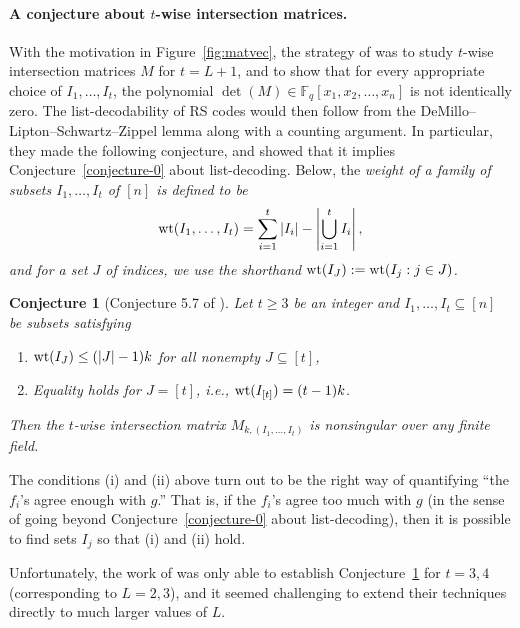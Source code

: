 \documentclass[11pt]{article}
\newtheorem{conjecture}[theorem]{Conjecture}
\newcommand{\s}{\subseteq}
\newcommand{\wt}{{\rm wt}}
\begin{document}
\paragraph{A conjecture about $t$-wise intersection matrices.}
With the motivation in Figure~\ref{fig:matvec}, the strategy of \cite{shangguan2019combinatorial0} was to study $t$-wise intersection matrices $M$ for $t = L+1$, and to show that for every appropriate choice of $I_1, \ldots, I_{t}$, the polynomial $\det(M) \in \mathbb{F}_q[x_1, x_2, \ldots, x_n]$ is not identically zero.  The list-decodability of RS codes would then follow from the DeMillo--Lipton--Schwartz--Zippel
 lemma along with a counting argument.
In particular, they made the following conjecture, and showed that it implies Conjecture~\ref{conjecture-0} about list-decoding.
Below, the \em weight \em of a family  of subsets $I_1,\ldots,I_t$ of $[n]$ is defined to be
\begin{equation}\label{definition-weight}
  {\rm wt}(I_1,\ldots,I_t)=\sum_{i=1}^t |I_i|-\left|\bigcup_{i=1}^t I_i\right|,
\end{equation}
and for a set $J$ of indices,  we use the shorthand   ${\rm wt}(I_J):={\rm wt}(I_j:j\in J)$.
\begin{conjecture}[Conjecture 5.7 of \cite{shangguan2019combinatorial0}]\label{conjecture}
  Let $t\ge 3$ be an integer and $I_1,\ldots,I_t\s[n]$ be subsets satisfying
  \begin{enumerate}
\item [\rm{(i)}] $\wt(I_J)\leq (|J|-1)k$ for all  nonempty $J\subseteq [t]$,
\item [\rm{(ii)}] Equality holds for $J=[t]$, i.e., $\wt(I_{[t]})=(t-1)k$.
  \end{enumerate}
  Then the $t$-wise intersection matrix $M_{k,(I_1,\ldots,I_t)}$ is nonsingular over any finite field.
\end{conjecture}

The conditions (i) and (ii) above turn out to be the right way of quantifying ``the $f_i$'s agree enough with $g$.''  That is, if the $f_i$'s agree too much with $g$ (in the sense of going beyond Conjecture~\ref{conjecture-0} about list-decoding), then it is possible to find sets $I_j$ so that (i) and (ii) hold.

Unfortunately, the work of \cite{shangguan2019combinatorial0} was only able to establish
Conjecture~\ref{conjecture}
for $t=3,4$ (corresponding to $L=2,3$), and it seemed challenging
to extend their techniques directly to much larger values of $L$.
\end{document}
